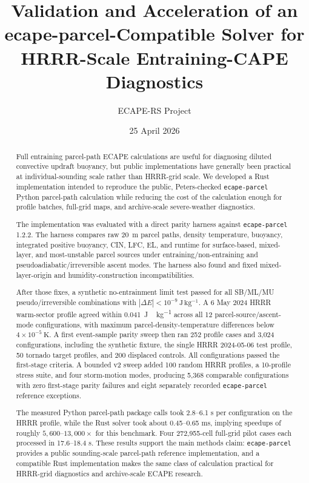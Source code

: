\documentclass[11pt]{article}
\title{Validation and Acceleration of an ecape-parcel-Compatible Solver for HRRR-Scale Entraining-CAPE Diagnostics}
\author{ECAPE-RS Project}
\date{25 April 2026}
\begin{document}
\maketitle

\begin{abstract}
Full entraining parcel-path ECAPE calculations are useful for diagnosing diluted convective updraft buoyancy, but public implementations have generally been practical at individual-sounding scale rather than HRRR-grid scale. We developed a Rust implementation intended to reproduce the public, Peters-checked \texttt{ecape-parcel} Python parcel-path calculation while reducing the cost of the calculation enough for profile batches, full-grid maps, and archive-scale severe-weather diagnostics.

The implementation was evaluated with a direct parity harness against \texttt{ecape-parcel} 1.2.2. The harness compares raw \SI{20}{m} parcel paths, density temperature, buoyancy, integrated positive buoyancy, CIN, LFC, EL, and runtime for surface-based, mixed-layer, and most-unstable parcel sources under entraining/non-entraining and pseudoadiabatic/irreversible ascent modes. The harness also found and fixed mixed-layer-origin and humidity-construction incompatibilities.

After those fixes, a synthetic no-entrainment limit test passed for all SB/ML/MU pseudo/irreversible combinations with $|\Delta E|<10^{-9}\ \mathrm{J\,kg^{-1}}$. A 6 May 2024 HRRR warm-sector profile agreed within \SI{0.041}{J\,kg^{-1}} across all 12 parcel-source/ascent-mode configurations, with maximum parcel-density-temperature differences below $4\times10^{-5}\ \mathrm{K}$. A first event-sample parity sweep then ran 252 profile cases and 3,024 configurations, including the synthetic fixture, the single HRRR 2024-05-06 test profile, 50 tornado target profiles, and 200 displaced controls. All configurations passed the first-stage criteria. A bounded v2 sweep added 100 random HRRR profiles, a 10-profile stress suite, and four storm-motion modes, producing 5,368 comparable configurations with zero first-stage parity failures and eight separately recorded \texttt{ecape-parcel} reference exceptions.

The measured Python parcel-path package calls took 2.8--6.1 s per configuration on the HRRR profile, while the Rust solver took about 0.45--0.65 ms, implying speedups of roughly $5{,}600$--$13{,}000\times$ for this benchmark. Four 272,955-cell full-grid pilot cases each processed in 17.6--18.4 s. These results support the main methods claim: \texttt{ecape-parcel} provides a public sounding-scale parcel-path reference implementation, and a compatible Rust implementation makes the same class of calculation practical for HRRR-grid diagnostics and archive-scale ECAPE research.
\end{abstract}
\end{document}
